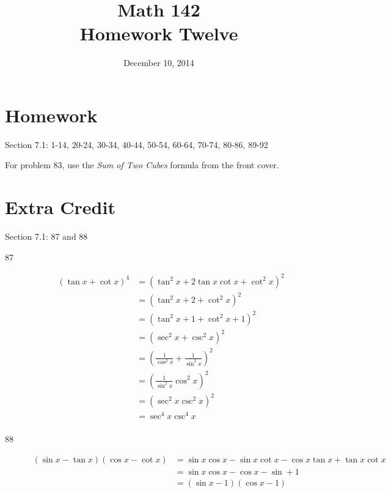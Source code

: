 \documentclass{exam}
\author{}
\date{December 10, 2014}
\title{Math 142 \\ Homework Twelve}
\begin{document}
  \maketitle

  \section{Homework}
  Section 7.1: 1-14, 20-24, 30-34, 40-44, 50-54, 60-64, 70-74, 80-86, 89-92

  For problem 83, use the {\em Sum of Two Cubes} formula from the front cover.

  \section{Extra Credit}
  Section 7.1: 87 and 88

  \ifprintanswers
    \pagebreak
    \begin{description}
      \item[87]
        \begin{align*}
          (\tan x + \cot x)^4 & = \left( \tan^2 x + 2 \tan x \cot x + \cot^2 x \right)^2 \\
                              & = \left( \tan^2 x + 2 + \cot^2 x \right)^2 \\
                              & = \left( \tan^2 x + 1 + \cot^2 x + 1 \right)^2 \\
                              & = \left( \sec^2 x + \csc^2 x \right)^2 \\
                              & = \left( \frac{1}{\cos^2 x} + \frac{1}{\sin^2 x} \right)^2 \\
                              & = \left( \frac{1}{\sin^2 x}{\cos^2 x} \right)^2 \\
                              & = \left( \sec^2 x \csc^2 x \right)^2 \\
                              & = \sec^4 x \csc^4 x \\
        \end{align*}

      \item[88]
        \begin{align*}
          (\sin x - \tan x)(\cos x - \cot x) & = \sin x \cos x - \sin x \cot x - \cos x \tan x + \tan x \cot x \\
                                             & = \sin x \cos x - \cos x - \sin + 1 \\
                                             & = (\sin x - 1)(\cos x - 1) \\
        \end{align*}

    \end{description}
  \fi
\end{document}
